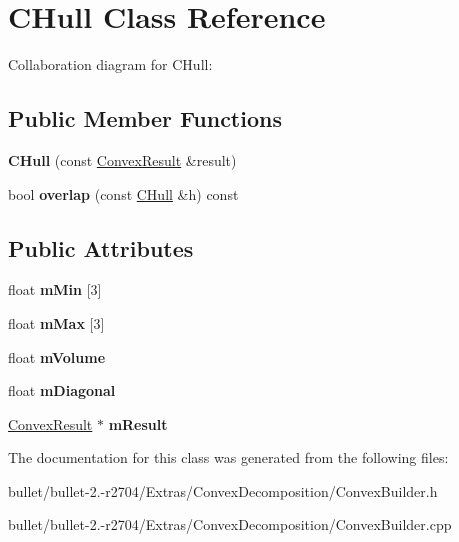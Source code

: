 \hypertarget{class_c_hull}{\section{C\+Hull Class Reference}
\label{class_c_hull}
}


Collaboration diagram for C\+Hull\+:
\subsection*{Public Member Functions}
\begin{DoxyCompactItemize}
\item 
\hypertarget{class_c_hull_ac3d6207a87359bb1c0d90e945b28d85b}{{\bfseries C\+Hull} (const \hyperlink{class_convex_decomposition_1_1_convex_result}{Convex\+Result} \&result)}\label{class_c_hull_ac3d6207a87359bb1c0d90e945b28d85b}

\item 
\hypertarget{class_c_hull_a30a0e6b490d7fd5c3d54090ff01304a0}{bool {\bfseries overlap} (const \hyperlink{class_c_hull}{C\+Hull} \&h) const }\label{class_c_hull_a30a0e6b490d7fd5c3d54090ff01304a0}

\end{DoxyCompactItemize}
\subsection*{Public Attributes}
\begin{DoxyCompactItemize}
\item 
\hypertarget{class_c_hull_a7e2b0c242e99ce07586426877428158b}{float {\bfseries m\+Min} \mbox{[}3\mbox{]}}\label{class_c_hull_a7e2b0c242e99ce07586426877428158b}

\item 
\hypertarget{class_c_hull_ae279e2bb3b7b3b3a2a85dadd362f6b62}{float {\bfseries m\+Max} \mbox{[}3\mbox{]}}\label{class_c_hull_ae279e2bb3b7b3b3a2a85dadd362f6b62}

\item 
\hypertarget{class_c_hull_ad8ef82af9ddfbbabc76486aae1c0a8cd}{float {\bfseries m\+Volume}}\label{class_c_hull_ad8ef82af9ddfbbabc76486aae1c0a8cd}

\item 
\hypertarget{class_c_hull_aced64e719b25f3f3fadbccc03c0e3531}{float {\bfseries m\+Diagonal}}\label{class_c_hull_aced64e719b25f3f3fadbccc03c0e3531}

\item 
\hypertarget{class_c_hull_a3c7d7fe1ad593540c4ba27564dae9c69}{\hyperlink{class_convex_decomposition_1_1_convex_result}{Convex\+Result} $\ast$ {\bfseries m\+Result}}\label{class_c_hull_a3c7d7fe1ad593540c4ba27564dae9c69}

\end{DoxyCompactItemize}


The documentation for this class was generated from the following files\+:\begin{DoxyCompactItemize}
\item 
bullet/bullet-\/2.-\/r2704/\+Extras/\+Convex\+Decomposition/Convex\+Builder.\+h\item 
bullet/bullet-\/2.-\/r2704/\+Extras/\+Convex\+Decomposition/Convex\+Builder.\+cpp\end{DoxyCompactItemize}
